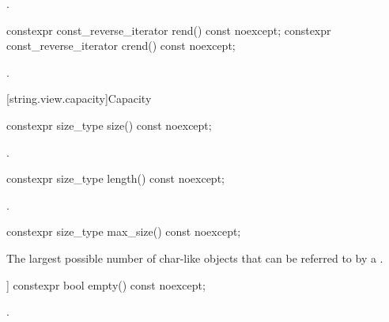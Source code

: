 \begin{itemdescr}
\pnum
\returns
{}.
\end{itemdescr}

%
%
\begin{itemdecl}
constexpr const_reverse_iterator rend() const noexcept;
constexpr const_reverse_iterator crend() const noexcept;
\end{itemdecl}

\begin{itemdescr}
\pnum
\returns
{}.
\end{itemdescr}

[string.view.capacity]{Capacity}

%
\begin{itemdecl}
constexpr size_type size() const noexcept;
\end{itemdecl}

\begin{itemdescr}
\pnum
\returns
{}.
\end{itemdescr}

%
\begin{itemdecl}
constexpr size_type length() const noexcept;
\end{itemdecl}

\begin{itemdescr}
\pnum
\returns
{}.
\end{itemdescr}

%
\begin{itemdecl}
constexpr size_type max_size() const noexcept;
\end{itemdecl}

\begin{itemdescr}
\pnum
\returns
The largest possible number of char-like objects that can be referred to by a .
\end{itemdescr}

%
\begin{itemdecl}
[[nodiscard]] constexpr bool empty() const noexcept;
\end{itemdecl}

\begin{itemdescr}
\pnum
\returns
{}.
\end{itemdescr}

